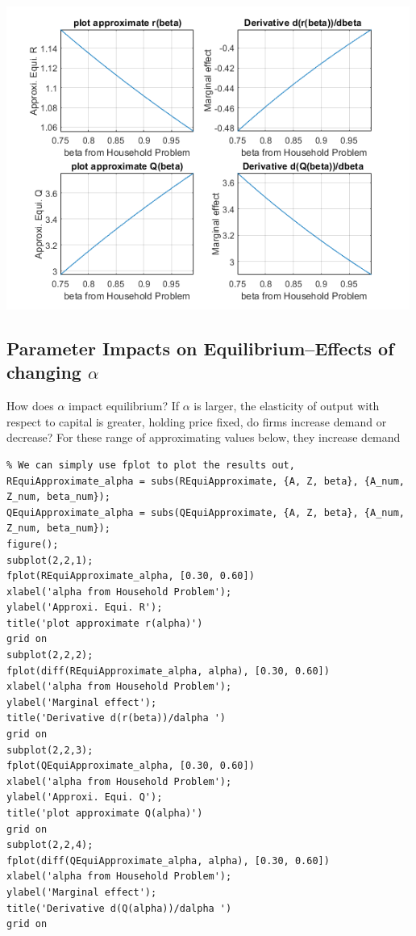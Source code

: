 \documentclass[
]{book}
\begin{document}
\includegraphics[width=5.20833in,height=\textheight]{img/demand_supply_taylor_approximate_capital_images/figure_3.png}

\hypertarget{parameter-impacts-on-equilibriumeffects-of-changing-alpha}{%
\subsection{\texorpdfstring{Parameter Impacts on Equilibrium--Effects of changing \(\alpha\)}{Parameter Impacts on Equilibrium--Effects of changing \textbackslash alpha}}\label{parameter-impacts-on-equilibriumeffects-of-changing-alpha}}

How does \(\alpha\) impact equilibrium? If \(\alpha\) is larger, the
elasticity of output with respect to capital is greater, holding price
fixed, do firms increase demand or decrease? For these range of
approximating values below, they increase demand

\begin{verbatim}
% We can simply use fplot to plot the results out, 
REquiApproximate_alpha = subs(REquiApproximate, {A, Z, beta}, {A_num, Z_num, beta_num});
QEquiApproximate_alpha = subs(QEquiApproximate, {A, Z, beta}, {A_num, Z_num, beta_num});
figure();
subplot(2,2,1);
fplot(REquiApproximate_alpha, [0.30, 0.60])
xlabel('alpha from Household Problem');
ylabel('Approxi. Equi. R');
title('plot approximate r(alpha)')
grid on
subplot(2,2,2);
fplot(diff(REquiApproximate_alpha, alpha), [0.30, 0.60])
xlabel('alpha from Household Problem');
ylabel('Marginal effect');
title('Derivative d(r(beta))/dalpha ')
grid on
subplot(2,2,3);
fplot(QEquiApproximate_alpha, [0.30, 0.60])
xlabel('alpha from Household Problem');
ylabel('Approxi. Equi. Q');
title('plot approximate Q(alpha)')
grid on
subplot(2,2,4);
fplot(diff(QEquiApproximate_alpha, alpha), [0.30, 0.60])
xlabel('alpha from Household Problem');
ylabel('Marginal effect');
title('Derivative d(Q(alpha))/dalpha ')
grid on
\end{verbatim}
\end{document}
